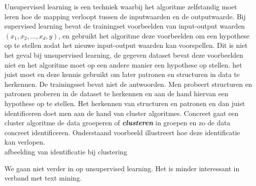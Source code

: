 Unsupervised learning is een techniek waarbij het algoritme zelfstandig moet leren hoe de mapping verloopt tussen de inputwaarden en de outputwaarde. Bij supervised learning bevat de trainingset voorbeelden van input-output waarden $(x_{1},x_{2},...,x_{d},y)$, en gebruikt het algoritme deze voorbeelden om een hypothese op te stellen zodat het nieuwe input-output waarden kan voorspellen. Dit is niet het geval bij unsupervised learning, de gegeven dataset bevat deze voorbeelden niet en het algoritme moet op een andere manier een hypothese op stellen.  het juist moet en deze kennis gebruikt om later patronen en structuren in data te herkennen. De trainingsset bevat niet de antwoorden.
\newline
Men probeert structuren en patronen proberen in de dataset te herkennen en aan de hand hiervan een hypothese op te stellen. Het herkennen van structuren en patronen en dan juist identificeren doet men aan de hand van cluster algoritmes. Concreet gaat een cluster algoritme de data groeperen of \textbf{\textit{clusteren}} in groepen en zo de data concreet identificeren. Onderstaand voorbeeld illustreert hoe deze identificatie kan verlopen.\\

afbeelding van identificatie bij clustering


We gaan niet verder in op unsupervised learning. Het is minder interessant in verband met text mining.
